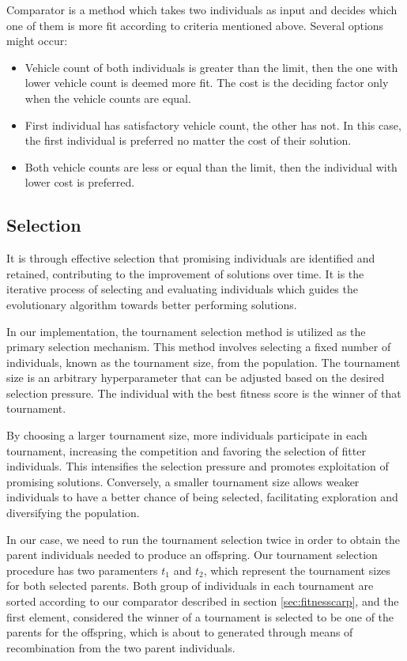 \documentclass[twoside]{ctuthesis}
\theoremstyle{plain}
\theoremstyle{definition}
\theoremstyle{note}
\begin{document}
Comparator is a method which takes two individuals as input and decides which one of them is more fit according to criteria mentioned above. Several options might occur:
\begin{itemize}
	\item Vehicle count of both individuals is greater than the limit, then the one with lower vehicle count is deemed more fit. The cost is the deciding factor only when the vehicle counts are equal.
	\item First individual has satisfactory vehicle count, the other has not. In this case, the first individual is preferred no matter the cost of their solution.
	\item Both vehicle counts are less or equal than the limit, then the individual with lower cost is preferred.
\end{itemize}

\subsection{Selection}
\label{sec:selectioncarp}
It is through effective selection that promising individuals are identified and retained, contributing to the improvement of solutions over time. It is the iterative process of selecting and evaluating individuals which guides the evolutionary algorithm towards better performing solutions.

In our implementation, the tournament selection method is utilized as the primary selection mechanism. This method involves selecting a fixed number of individuals, known as the tournament size, from the population. The tournament size is an arbitrary hyperparameter that can be adjusted based on the desired selection pressure. The individual with the best fitness score is the winner of that tournament.

By choosing a larger tournament size, more individuals participate in each tournament, increasing the competition and favoring the selection of fitter individuals. This intensifies the selection pressure and promotes exploitation of promising solutions. Conversely, a smaller tournament size allows weaker individuals to have a better chance of being selected, facilitating exploration and diversifying the population.

In our case, we need to run the tournament selection twice in order to obtain the parent individuals needed to produce an offspring. Our tournament selection procedure has two paramenters \emph{$t_1$} and \emph{$t_2$}, which represent the tournament sizes for both selected parents. Both group of individuals in each tournament are sorted according to our comparator described in section \ref{sec:fitnesscarp}, and the first element, considered the winner of a tournament is selected to be one of the parents for the offspring, which is about to generated through means of recombination from the two parent individuals.
\end{document}
